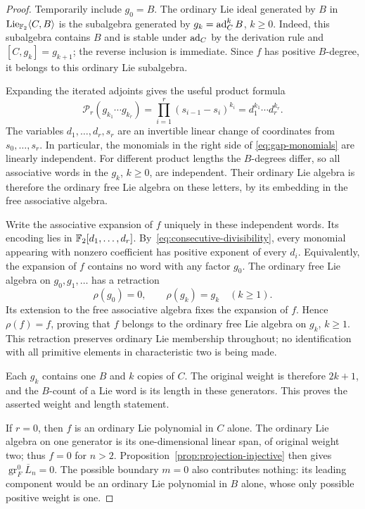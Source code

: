 \begin{proof}
Temporarily include $g_0=B$.
The ordinary Lie ideal generated by $B$ in
$\operatorname{Lie}_{{\mathbb F_2}}\langle C,B\rangle$ is the subalgebra generated by
$g_k=\operatorname{ad}_C^kB$, $k\geq0$.
Indeed, this subalgebra contains $B$ and is stable under $\operatorname{ad}_C$
by the derivation rule and $[C,g_k]=g_{k+1}$; the reverse inclusion
is immediate.  Since $f$ has positive $B$-degree, it belongs to
this ordinary Lie subalgebra.

Expanding the iterated adjoints gives the useful product formula
\begin{equation}
 \label{eq:gap-monomials}
 \mathcal P_r(g_{k_1}\cdots g_{k_r})
 =\prod_{i=1}^r(s_{i-1}-s_i)^{k_i}
 =d_1^{k_1}\cdots d_r^{k_r}.
\end{equation}
The variables $d_1,\ldots,d_r,s_r$ are an invertible linear
change of coordinates from $s_0,\ldots,s_r$.
In particular, the monomials in the right side of
\eqref{eq:gap-monomials} are linearly independent.
For different product lengths the $B$-degrees differ, so all
associative words in the $g_k$, $k\geq0$, are independent.
Their ordinary Lie algebra is therefore the ordinary free Lie
algebra on these letters, by its embedding in the free associative
algebra.

Write the associative expansion of $f$ uniquely in these independent
words.  Its encoding lies in ${\mathbb F_2}[d_1,\ldots,d_r]$.
By~\eqref{eq:consecutive-divisibility}, every monomial appearing
with nonzero coefficient has positive exponent of every $d_i$.
Equivalently, the expansion of $f$ contains no word with any factor
$g_0$.  The ordinary free Lie algebra on $g_0,g_1,\ldots$ has a
retraction
\[
 \rho(g_0)=0,\qquad \rho(g_k)=g_k\quad(k\geq1).
\]
Its extension to the free associative algebra fixes the expansion
of $f$.  Hence $\rho(f)=f$, proving that $f$ belongs to the
ordinary free Lie algebra on $g_k$, $k\geq1$.
This retraction preserves ordinary Lie membership throughout;
no identification with all primitive elements in characteristic
two is being made.

Each $g_k$ contains one $B$ and $k$ copies of $C$.
The original weight is therefore $2k+1$, and the $B$-count of a
Lie word is its length in these generators.  This proves the
asserted weight and length statement.

If $r=0$, then $f$ is an ordinary Lie polynomial in $C$ alone.
The ordinary Lie algebra on one generator is its one-dimensional
linear span, of original weight two; thus $f=0$ for $n>2$.
Proposition~\ref{prop:projection-injective} then gives
$\operatorname{gr}^0_F\overline L_n=0$.
The possible boundary $m=0$ also contributes nothing: its leading
component would be an ordinary Lie polynomial in $B$ alone,
whose only possible positive weight is one.
\end{proof}

